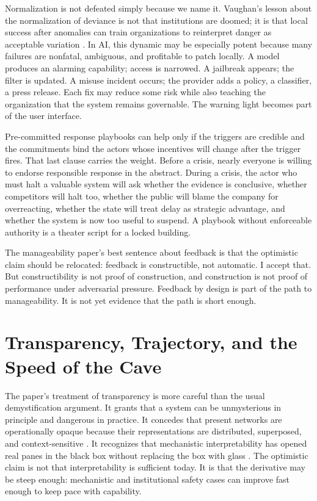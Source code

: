 \documentclass[11pt]{article}
\begin{document}
Normalization is not defeated simply because we name it. Vaughan's lesson about the normalization of deviance is not that institutions are doomed; it is that local success after anomalies can train organizations to reinterpret danger as acceptable variation \citep{vaughan1996}. In AI, this dynamic may be especially potent because many failures are nonfatal, ambiguous, and profitable to patch locally. A model produces an alarming capability; access is narrowed. A jailbreak appears; the filter is updated. A misuse incident occurs; the provider adds a policy, a classifier, a press release. Each fix may reduce some risk while also teaching the organization that the system remains governable. The warning light becomes part of the user interface.

Pre-committed response playbooks can help only if the triggers are credible and the commitments bind the actors whose incentives will change after the trigger fires. That last clause carries the weight. Before a crisis, nearly everyone is willing to endorse responsible response in the abstract. During a crisis, the actor who must halt a valuable system will ask whether the evidence is conclusive, whether competitors will halt too, whether the public will blame the company for overreacting, whether the state will treat delay as strategic advantage, and whether the system is now too useful to suspend. A playbook without enforceable authority is a theater script for a locked building.

The manageability paper's best sentence about feedback is that the optimistic claim should be relocated: feedback is constructible, not automatic. I accept that. But constructibility is not proof of construction, and construction is not proof of performance under adversarial pressure. Feedback by design is part of the path to manageability. It is not yet evidence that the path is short enough.

\section{Transparency, Trajectory, and the Speed of the Cave}
\label{sec:transparency}

The paper's treatment of transparency is more careful than the usual demystification argument. It grants that a system can be unmysterious in principle and dangerous in practice. It concedes that present networks are operationally opaque because their representations are distributed, superposed, and context-sensitive \citep{elhage2022}. It recognizes that mechanistic interpretability has opened real panes in the black box without replacing the box with glass \citep{templeton2024}. The optimistic claim is not that interpretability is sufficient today. It is that the derivative may be steep enough: mechanistic and institutional safety cases can improve fast enough to keep pace with capability.
\end{document}
